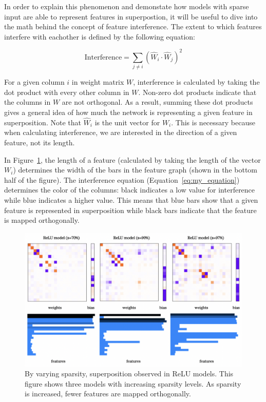 \documentclass{article} %
\begin{document}
In order to explain this phenomenon and demonstate how models with sparse input
are able to represent features in superpostion, it will be useful to dive into 
the math behind the concept of feature interference. The extent to which 
features interfere with eachother is defined by the following equation:

\begin{equation}
\label{eq:my_equation}
\text{Interference} = \sum_{j \neq i} (\hat{W}_i \cdot \hat{W}_j)^2
\end{equation}

For a given column $i$ in weight matrix $W$, interference is calculated by taking
the dot product with every other column in $W$. Non-zero dot products indicate
that the columns in $W$ are not orthogonal. As a result, summing these dot 
products gives a general idea of how much the network is representing a given
feature in superposition. Note that $\hat{W}_i$ is the unit vector for $W_i$. 
This is necessary because when calculating interference, we are interested in
the direction of a given feature, not its length.\newline

In Figure~\ref{fig:sparsity_1}, the length of a feature (calculated by taking the
length of the vector $W_i$) determines the width of the bars in the feature
graph (shown in the bottom half of the figure). The interference equation (Equation~\ref{eq:my_equation}) determines the
color of the columns: black indicates a low value for interference
while blue indicates a higher value. This means that blue bars show that a given feature is represented
in superposition while black bars indicate that the feature is mapped orthogonally.
    

\begin{figure}[h]
    \centering
    \includegraphics[width=0.75\linewidth]{demonstrating_superposition/images/sparsity_superposition1.png}
    \captionsetup{font=footnotesize, width=0.7\linewidth} %
    \caption{
        By varying sparsity, superposition observed in ReLU models. This figure
        shows three models with increasing sparsity levels. As sparsity is increased, 
        fewer features are mapped orthogonally.
    }
    \label{fig:sparsity_1}
\end{figure}
\end{document}
